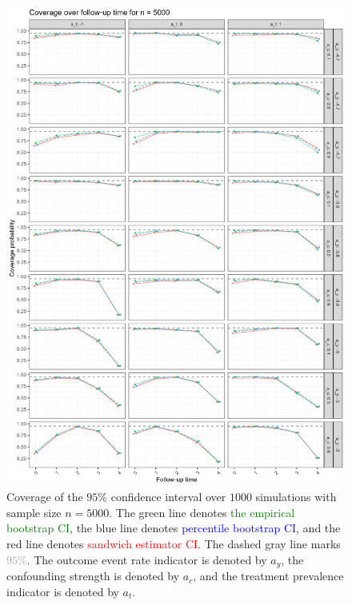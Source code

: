 \documentclass[pdflatex,sn-vancouver-ay]{sn-jnl}%
\theoremstyle{thmstyleone}%
\theoremstyle{thmstyletwo}%
\theoremstyle{thmstylethree}%
\begin{document}
\begin{appendices}
\begin{figure}[H]
\centering
\includegraphics[height=0.95\textheight]{plots/plots_coverage5000.png}
\caption{Coverage of the $95\%$ confidence interval over $1000$ simulations with sample size $n = 5000$. The green line denotes \textcolor{green}{the empirical bootstrap CI}, the blue line denotes \textcolor{blue}{percentile bootstrap CI}, and the red line denotes \textcolor{red}{sandwich estimator CI}. The dashed gray line marks \textcolor{darkgray}{$95\%$}. The outcome event rate indicator is denoted by $a_y$, the confounding strength is denoted by $a_c$, and the treatment prevalence indicator is denoted by $a_t$.}\label{plt:coverage5000}
\end{figure}

\newpage


\end{appendices}
\end{document}
